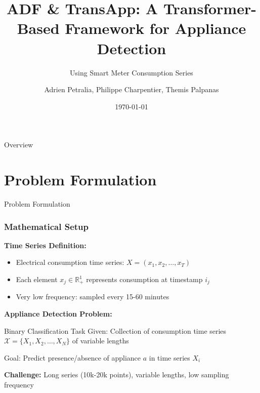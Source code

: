\documentclass{beamer}
\title{ADF \& TransApp: A Transformer-Based Framework for Appliance Detection}
\subtitle{Using Smart Meter Consumption Series}
\author{Adrien Petralia, Philippe Charpentier, Themis Palpanas}
\date{\today}
\begin{document}
\frame{\titlepage}

\begin{frame}{Overview}
\tableofcontents
\end{frame}

\section{Problem Formulation}

\begin{frame}{Problem Formulation}
\frametitle{Mathematical Setup}

\textbf{Time Series Definition:}
\begin{itemize}
    \item Electrical consumption time series: $X = (x_1, x_2, \ldots, x_T)$
    \item Each element $x_j \in \mathbb{R}^1_+$ represents consumption at timestamp $i_j$
    \item Very low frequency: sampled every 15-60 minutes
\end{itemize}

\vspace{0.5cm}

\textbf{Appliance Detection Problem:}
\begin{block}{Binary Classification Task}
Given: Collection of consumption time series $\mathcal{X} = \{X_1, X_2, \ldots, X_N\}$ of variable lengths

Goal: Predict presence/absence of appliance $a$ in time series $X_i$
\end{block}

\vspace{0.3cm}

\textbf{Challenge:} Long series (10k-20k points), variable lengths, low sampling frequency
\end{frame}
\end{document}
